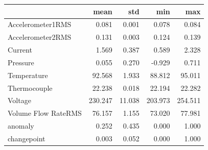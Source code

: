 \begin{tabular}{lrrrr}
\toprule
 & mean & std & min & max \\
\midrule
Accelerometer1RMS & 0.081 & 0.001 & 0.078 & 0.084 \\
Accelerometer2RMS & 0.131 & 0.003 & 0.124 & 0.139 \\
Current & 1.569 & 0.387 & 0.589 & 2.328 \\
Pressure & 0.055 & 0.270 & -0.929 & 0.711 \\
Temperature & 92.568 & 1.933 & 88.812 & 95.011 \\
Thermocouple & 22.238 & 0.018 & 22.194 & 22.282 \\
Voltage & 230.247 & 11.038 & 203.973 & 254.511 \\
Volume Flow RateRMS & 76.157 & 1.155 & 73.020 & 77.981 \\
anomaly & 0.252 & 0.435 & 0.000 & 1.000 \\
changepoint & 0.003 & 0.052 & 0.000 & 1.000 \\
\bottomrule
\end{tabular}
